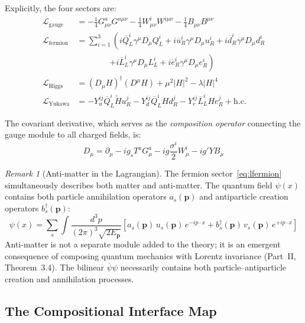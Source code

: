 \documentclass[12pt]{article}
\theoremstyle{definition}
\theoremstyle{remark}
\newtheorem{remark}[theorem]{Remark}
\newcommand{\Lagr}{\mathcal{L}}
\newcommand{\psibar}{\overline{\psi}}
\newcommand{\Qbar}{\overline{Q}}
\newcommand{\Lbar}{\overline{L}}
\newcommand{\ubar}{\overline{u}}
\newcommand{\dbar}{\overline{d}}
\newcommand{\ebar}{\overline{e}}
\newcommand{\Htilde}{\widetilde{H}}
\begin{document}
Explicitly, the four sectors are:
\begin{align}
\Lagr_{\mathrm{gauge}} &= -\frac{1}{4}G^a_{\mu\nu}G^{a\mu\nu} - \frac{1}{4}W^i_{\mu\nu}W^{i\mu\nu} - \frac{1}{4}B_{\mu\nu}B^{\mu\nu} \label{eq:lgauge}\\[6pt]
\Lagr_{\mathrm{fermion}} &= \sum_{i=1}^{3} \left( i\Qbar_L^i \gamma^\mu D_\mu Q_L^i + i\ubar_R^i \gamma^\mu D_\mu u_R^i + i\dbar_R^i \gamma^\mu D_\mu d_R^i \right. \nonumber\\
&\qquad\qquad \left. + i\Lbar_L^i \gamma^\mu D_\mu L_L^i + i\ebar_R^i \gamma^\mu D_\mu e_R^i \right) \label{eq:lfermion}\\[6pt]
\Lagr_{\mathrm{Higgs}} &= (D_\mu H)^\dagger(D^\mu H) + \mu^2 |H|^2 - \lambda |H|^4 \label{eq:lhiggs}\\[6pt]
\Lagr_{\mathrm{Yukawa}} &= -Y_u^{ij}\Qbar_L^i \Htilde u_R^j - Y_d^{ij}\Qbar_L^i H d_R^j - Y_e^{ij}\Lbar_L^i H e_R^j + \mathrm{h.c.} \label{eq:lyukawa}
\end{align}

The covariant derivative, which serves as the \emph{composition operator} connecting the gauge module to all charged fields, is:
\begin{equation}
\label{eq:covariant-derivative}
D_\mu = \partial_\mu - ig_s T^a G^a_\mu - ig\frac{\sigma^i}{2}W^i_\mu - ig'YB_\mu
\end{equation}

\begin{remark}[Anti-matter in the Lagrangian]
The fermion sector~\eqref{eq:lfermion} simultaneously describes both matter and anti-matter. The quantum field $\psi(x)$ contains both particle annihilation operators $a_s(\mathbf{p})$ and antiparticle creation operators $b_s^\dagger(\mathbf{p})$:
\begin{equation}
\psi(x) = \sum_s \int \frac{d^3p}{(2\pi)^3\sqrt{2E_\mathbf{p}}} \left[ a_s(\mathbf{p})\, u_s(\mathbf{p})\, e^{-ip\cdot x} + b_s^\dagger(\mathbf{p})\, v_s(\mathbf{p})\, e^{+ip\cdot x} \right]
\end{equation}
Anti-matter is not a separate module added to the theory; it is an emergent consequence of composing quantum mechanics with Lorentz invariance (Part~II, Theorem~3.4). The bilinear $\psibar\psi$ necessarily contains both particle--antiparticle creation and annihilation processes.
\end{remark}

\subsection{The Compositional Interface Map}
\end{document}

